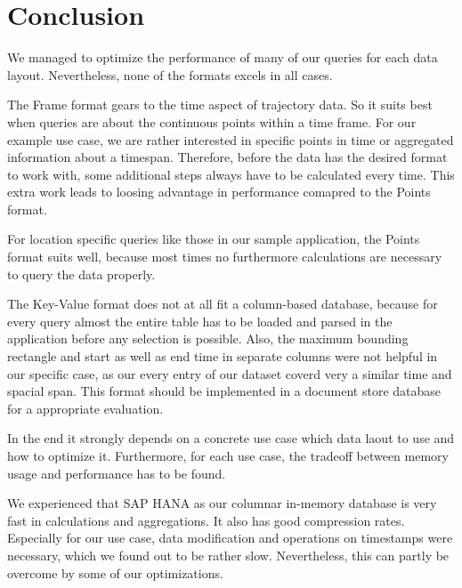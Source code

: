 \documentclass[10pt]{sig-alternate}
\begin{document}
\section{Conclusion}
We managed to optimize the performance of many of our queries for each data layout. Nevertheless, none of the formats excels in all cases.

The Frame format gears to the time aspect of trajectory data. So it suits best when queries are about the continuous points within a time frame. For our example use case, we are rather interested in specific points in time or aggregated information about a timespan. Therefore, before the data has the desired format to work with, some additional steps always have to be calculated every time. This extra work leads to loosing advantage in performance comapred to the Points format.

For location specific queries like those in our sample application, the Points format suits well, because most times no furthermore calculations are necessary to query the data properly.

The Key-Value format does not at all fit a column-based database, because for every query almost the entire table has to be loaded and parsed in the application before any selection is possible. Also, the maximum bounding rectangle and start as well as end time in separate columns were not helpful in our specific case, as our every entry of our dataset coverd very a similar time and spacial span. This format should be implemented in a document store database for a appropriate evaluation.

In the end it strongly depends on a concrete use case which data laout to use and how to optimize it. Furthermore, for each use case, the tradeoff between memory usage and performance has to be found.

We experienced that SAP HANA as our columnar in-memory database is very fast in calculations and aggregations. It also has good compression rates. Especially for our use case, data modification and operations on timestamps were necessary, which we found out to be rather slow. Nevertheless, this can partly be overcome by some of our optimizations.

% 


\end{document}
